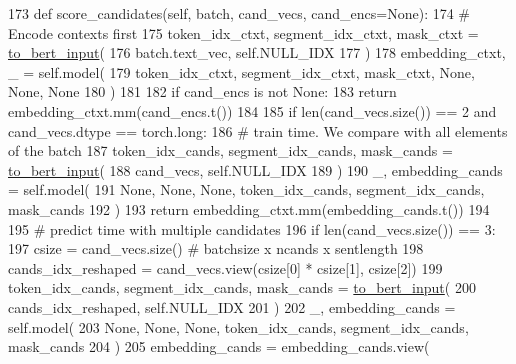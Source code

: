 \begin{DoxyCode}
173     \textcolor{keyword}{def }score\_candidates(self, batch, cand\_vecs, cand\_encs=None):
174         \textcolor{comment}{# Encode contexts first}
175         token\_idx\_ctxt, segment\_idx\_ctxt, mask\_ctxt = \hyperlink{namespaceparlai_1_1agents_1_1bert__ranker_1_1bi__encoder__ranker_afd88e1e1699d975ab19ea38e8ae77e20}{to\_bert\_input}(
176             batch.text\_vec, self.NULL\_IDX
177         )
178         embedding\_ctxt, \_ = self.model(
179             token\_idx\_ctxt, segment\_idx\_ctxt, mask\_ctxt, \textcolor{keywordtype}{None}, \textcolor{keywordtype}{None}, \textcolor{keywordtype}{None}
180         )
181 
182         \textcolor{keywordflow}{if} cand\_encs \textcolor{keywordflow}{is} \textcolor{keywordflow}{not} \textcolor{keywordtype}{None}:
183             \textcolor{keywordflow}{return} embedding\_ctxt.mm(cand\_encs.t())
184 
185         \textcolor{keywordflow}{if} len(cand\_vecs.size()) == 2 \textcolor{keywordflow}{and} cand\_vecs.dtype == torch.long:
186             \textcolor{comment}{# train time. We compare with all elements of the batch}
187             token\_idx\_cands, segment\_idx\_cands, mask\_cands = \hyperlink{namespaceparlai_1_1agents_1_1bert__ranker_1_1bi__encoder__ranker_afd88e1e1699d975ab19ea38e8ae77e20}{to\_bert\_input}(
188                 cand\_vecs, self.NULL\_IDX
189             )
190             \_, embedding\_cands = self.model(
191                 \textcolor{keywordtype}{None}, \textcolor{keywordtype}{None}, \textcolor{keywordtype}{None}, token\_idx\_cands, segment\_idx\_cands, mask\_cands
192             )
193             \textcolor{keywordflow}{return} embedding\_ctxt.mm(embedding\_cands.t())
194 
195         \textcolor{comment}{# predict time with multiple candidates}
196         \textcolor{keywordflow}{if} len(cand\_vecs.size()) == 3:
197             csize = cand\_vecs.size()  \textcolor{comment}{# batchsize x ncands x sentlength}
198             cands\_idx\_reshaped = cand\_vecs.view(csize[0] * csize[1], csize[2])
199             token\_idx\_cands, segment\_idx\_cands, mask\_cands = \hyperlink{namespaceparlai_1_1agents_1_1bert__ranker_1_1bi__encoder__ranker_afd88e1e1699d975ab19ea38e8ae77e20}{to\_bert\_input}(
200                 cands\_idx\_reshaped, self.NULL\_IDX
201             )
202             \_, embedding\_cands = self.model(
203                 \textcolor{keywordtype}{None}, \textcolor{keywordtype}{None}, \textcolor{keywordtype}{None}, token\_idx\_cands, segment\_idx\_cands, mask\_cands
204             )
205             embedding\_cands = embedding\_cands.view(

\end{DoxyCode}
